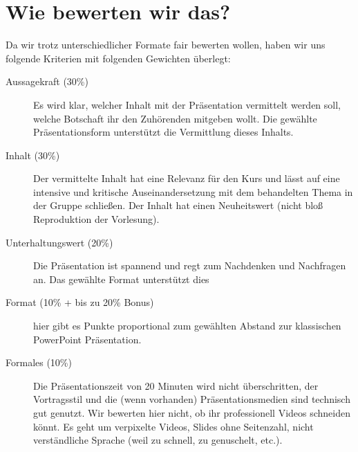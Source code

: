 \documentclass[DIV=15,headinclude=true]{scrartcl}
\begin{document}
\section{Wie bewerten wir das?}

Da wir trotz unterschiedlicher Formate fair bewerten wollen, haben wir
uns folgende Kriterien mit folgenden Gewichten überlegt:

\begin{description}
	\item[Aussagekraft (30\%)]
	      Es wird klar, welcher Inhalt mit der Präsentation vermittelt werden
	      soll, welche Botschaft ihr den Zuhörenden mitgeben wollt. Die gewählte
	      Präsentationsform unterstützt die Vermittlung dieses Inhalts.
	\item[Inhalt (30\%)]
	      Der vermittelte Inhalt hat eine Relevanz für den Kurs und lässt auf eine
	      intensive und kritische Auseinandersetzung mit dem behandelten Thema in
	      der Gruppe schließen. Der Inhalt hat einen Neuheitswert (nicht bloß
	      Reproduktion der Vorlesung).
	\item[Unterhaltungswert (20\%)]
	      Die Präsentation ist spannend und regt zum Nachdenken und Nachfragen an.
	      Das gewählte Format unterstützt dies
	\item[Format (10\% + bis zu 20\% Bonus)]
	      hier gibt es Punkte proportional zum gewählten Abstand zur klassischen
	      PowerPoint Präsentation.
	\item[Formales (10\%)]
	      Die Präsentationszeit von 20 Minuten wird nicht überschritten, der
	      Vortragsstil und die (wenn vorhanden) Präsentationsmedien sind technisch
	      gut genutzt. Wir bewerten hier nicht, ob ihr professionell Videos
	      schneiden könnt. Es geht um verpixelte Videos, Slides ohne Seitenzahl,
	      nicht verständliche Sprache (weil zu schnell, zu genuschelt, etc.).
\end{description}

\end{document}
